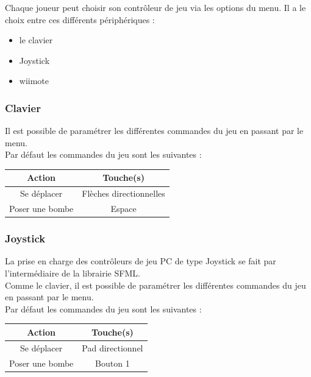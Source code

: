 Chaque joueur peut choisir son contrôleur de jeu via les options du menu. Il a le choix entre ces différents périphériques :\\

\begin{itemize}
	\item le clavier
	\item Joystick
	\item wiimote
\end{itemize}
	
	
\subsubsection{Clavier}
Il est possible de paramétrer les différentes commandes du jeu en passant par le menu.\\
Par défaut les commandes du jeu sont les suivantes :\\

\begin{center}
	\begin{tabular}{|c|c|}
		\hline
			\rowcolor{blueTab}
			\textbf{Action} & \textbf{Touche(s)} \\
		\hline
		Se déplacer & Flèches directionnelles \\
		\hline
		Poser une bombe & Espace\\
		\hline
	\end{tabular}
\end{center}

\subsubsection{Joystick}
La prise en charge des contrôleurs de jeu PC de type Joystick se fait par l'intermédiaire de la librairie SFML.\\
Comme le clavier, il est possible de paramétrer les différentes commandes du jeu en passant par le menu.\\
Par défaut les commandes du jeu sont les suivantes :\\

\begin{center}
	\begin{tabular}{|c|c|}
		\hline
			\rowcolor{blueTab}
			\textbf{Action} & \textbf{Touche(s)} \\
		\hline
		Se déplacer & Pad directionnel \\
		\hline
		Poser une bombe & Bouton 1\\
		\hline
	\end{tabular}
\end{center}


